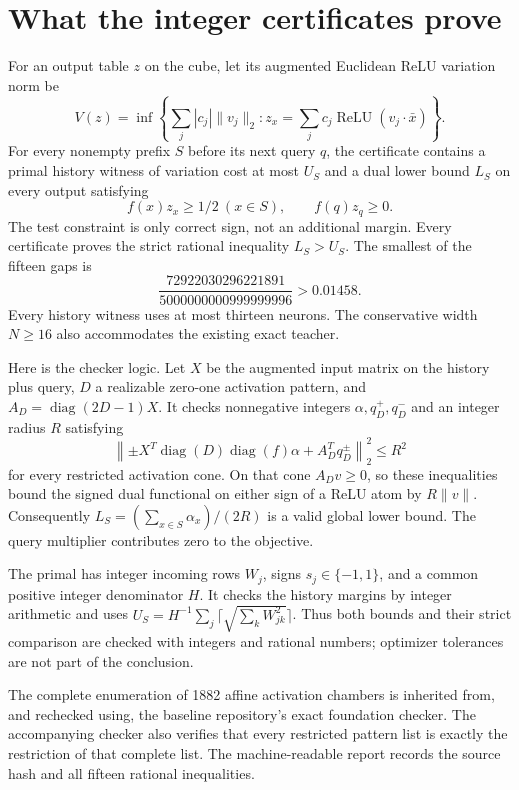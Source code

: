 \documentclass[11pt]{article}
\newcommand{\relu}{\operatorname{ReLU}}
\begin{document}
\section{What the integer certificates prove}
For an output table $z$ on the cube, let its augmented Euclidean ReLU
variation norm be
\[
 V(z)=\inf\left\{\sum_j|c_j|\|v_j\|_2:
                   z_x=\sum_jc_j\relu(v_j\cdot\bar x)\right\}.
\]
For every nonempty prefix $S$ before its next query $q$, the certificate
contains a primal history witness of variation cost at most $U_S$ and
a dual lower bound $L_S$ on every output satisfying
\[
 f(x)z_x\ge1/2\ (x\in S),\qquad f(q)z_q\ge0.
\]
The test constraint is only correct sign, not an additional margin.
Every certificate proves the strict rational inequality $L_S>U_S$.
The smallest of the fifteen gaps is
\[
 \frac{72922030296221891}{5000000000999999996}>0.01458.
\]
Every history witness uses at most thirteen neurons. The conservative
width $N\ge16$ also accommodates the existing exact teacher.

Here is the checker logic. Let $X$ be the augmented input matrix on
the history plus query, $D$ a realizable zero-one activation pattern,
and $A_D=\operatorname{diag}(2D-1)X$. It checks nonnegative integers
$\alpha,q_D^+,q_D^-$ and an integer radius $R$ satisfying
\[
 \left\|\pm X^T\operatorname{diag}(D)\operatorname{diag}(f)\alpha
                     +A_D^Tq_D^\pm\right\|_2^2\le R^2
\]
for every restricted activation cone. On that cone $A_Dv\ge0$, so
these inequalities bound the signed dual functional on either sign of
a ReLU atom by $R\|v\|$. Consequently
$L_S=(\sum_{x\in S}\alpha_x)/(2R)$ is a valid global lower bound.
The query multiplier contributes zero to the objective.

The primal has integer incoming rows $W_j$, signs $s_j\in\{-1,1\}$,
and a common positive integer denominator $H$. It checks the history
margins by integer arithmetic and uses
$U_S=H^{-1}\sum_j\lceil\sqrt{\sum_kW_{jk}^2}\rceil$. Thus both bounds
and their strict comparison are checked with integers and rational
numbers; optimizer tolerances are not part of the conclusion.

The complete enumeration of 1882 affine activation chambers is inherited
from, and rechecked using, the baseline repository's exact foundation
checker. The accompanying checker also verifies that every restricted pattern
list is exactly the restriction of that complete list. The machine-readable
report records the source hash and all fifteen rational inequalities.
\end{document}
